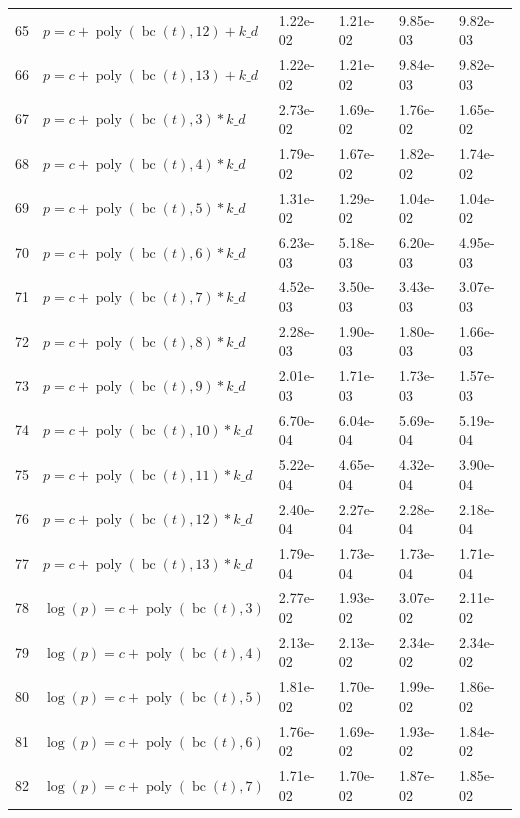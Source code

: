 \documentclass[12pt,a4paper]{article}
\DeclareMathOperator{\bc}{bc}
\DeclareMathOperator{\poly}{poly}
\begin{document}
\begin{longtable}[t]{ll>{\raggedleft\arraybackslash}p{2cm}>{\raggedleft\arraybackslash}p{2cm}>{\raggedleft\arraybackslash}p{2cm}>{\raggedleft\arraybackslash}p{2cm}}
\rowcolor{gray!6}  65 & $p = c + \poly\left( \bc(t), 12 \right) + k\_d$ & 1.22e-02 & 1.21e-02 & 9.85e-03 & 9.82e-03\\
66 & $p = c + \poly\left( \bc(t), 13 \right) + k\_d$ & 1.22e-02 & 1.21e-02 & 9.84e-03 & 9.82e-03\\
\rowcolor{gray!6}  67 & $p = c + \poly\left( \bc(t), 3 \right) * k\_d$ & 2.73e-02 & 1.69e-02 & 1.76e-02 & 1.65e-02\\
68 & $p = c + \poly\left( \bc(t), 4 \right) * k\_d$ & 1.79e-02 & 1.67e-02 & 1.82e-02 & 1.74e-02\\
\rowcolor{gray!6}  69 & $p = c + \poly\left( \bc(t), 5 \right) * k\_d$ & 1.31e-02 & 1.29e-02 & 1.04e-02 & 1.04e-02\\
70 & $p = c + \poly\left( \bc(t), 6 \right) * k\_d$ & 6.23e-03 & 5.18e-03 & 6.20e-03 & 4.95e-03\\
\rowcolor{gray!6}  71 & $p = c + \poly\left( \bc(t), 7 \right) * k\_d$ & 4.52e-03 & 3.50e-03 & 3.43e-03 & 3.07e-03\\
72 & $p = c + \poly\left( \bc(t), 8 \right) * k\_d$ & 2.28e-03 & 1.90e-03 & 1.80e-03 & 1.66e-03\\
\rowcolor{gray!6}  73 & $p = c + \poly\left( \bc(t), 9 \right) * k\_d$ & 2.01e-03 & 1.71e-03 & 1.73e-03 & 1.57e-03\\
74 & $p = c + \poly\left( \bc(t), 10 \right) * k\_d$ & 6.70e-04 & 6.04e-04 & 5.69e-04 & 5.19e-04\\
\rowcolor{gray!6}  75 & $p = c + \poly\left( \bc(t), 11 \right) * k\_d$ & 5.22e-04 & 4.65e-04 & 4.32e-04 & 3.90e-04\\
76 & $p = c + \poly\left( \bc(t), 12 \right) * k\_d$ & 2.40e-04 & 2.27e-04 & 2.28e-04 & 2.18e-04\\
\rowcolor{gray!6}  77 & $p = c + \poly\left( \bc(t), 13 \right) * k\_d$ & 1.79e-04 & 1.73e-04 & 1.73e-04 & 1.71e-04\\
78 & $\log(p) = c + \poly\left( \bc(t), 3 \right)$ & 2.77e-02 & 1.93e-02 & 3.07e-02 & 2.11e-02\\
\rowcolor{gray!6}  79 & $\log(p) = c + \poly\left( \bc(t), 4 \right)$ & 2.13e-02 & 2.13e-02 & 2.34e-02 & 2.34e-02\\
80 & $\log(p) = c + \poly\left( \bc(t), 5 \right)$ & 1.81e-02 & 1.70e-02 & 1.99e-02 & 1.86e-02\\
\rowcolor{gray!6}  81 & $\log(p) = c + \poly\left( \bc(t), 6 \right)$ & 1.76e-02 & 1.69e-02 & 1.93e-02 & 1.84e-02\\
82 & $\log(p) = c + \poly\left( \bc(t), 7 \right)$ & 1.71e-02 & 1.70e-02 & 1.87e-02 & 1.85e-02\\

\end{longtable}
\end{document}
